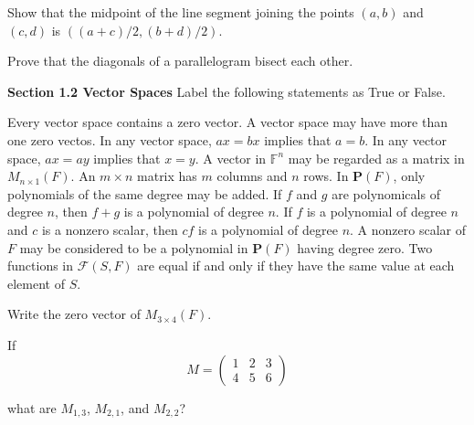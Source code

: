 \documentclass[11pt,largemargins]{homework}
\begin{document}
\question
Show that the midpoint of the line segment joining the points $(a,b)$ and $(c,d)$ is $((a+c)/2, (b+d)/2)$.

\question
Prove that the diagonals of a parallelogram bisect each other.


\hfill 

\textbf{\large{Section 1.2} Vector Spaces}
\setcounter{questionCounter}{0}
\question
Label the following statements as True or False.
\begin{alphaparts}
    \questionpart
    Every vector space contains a zero vector.
    \questionpart
    A vector space may have more than one zero vectos.
    \questionpart
    In any vector space, $ax=bx$ implies that $a=b$.
    \questionpart
    In any vector space, $ax=ay$ implies that $x=y$.
    \questionpart
    A vector in $\mathbb{F}^n$ may be regarded as a matrix in $M_{n\times 1}(F)$.
    \questionpart
    An $m\times n$ matrix has $m$ columns and $n$ rows.
    \questionpart
    In $\mathbf{P}(F)$, only polynomials of the same degree may be added.
    \questionpart
    If $f$ and $g$ are polynomicals of degree $n$, then $f+g$ is a polynomial of degree $n$.
    \questionpart
    If $f$ is a polynomial of degree $n$ and $c$ is a nonzero scalar, then $cf$ is a polynomial of degree $n$.
    \questionpart
    A nonzero scalar of $F$ may be considered to be a polynomial in $\mathbf{P}(F)$ having degree zero.
    \questionpart
    Two functions in $\mathcal{F}(S,F)$ are equal if and only if they have the same value at each element of $S$.
\end{alphaparts}

\question
Write the zero vector of $M_{3\times 4}(F)$.

\question
If 
\[
M=
\begin{pmatrix}
    1 & 2 & 3 \\
    4 & 5 & 6
\end{pmatrix}
\]

what are $M_{1,3}$, $M_{2,1}$, and $M_{2,2}$?
\end{document}

